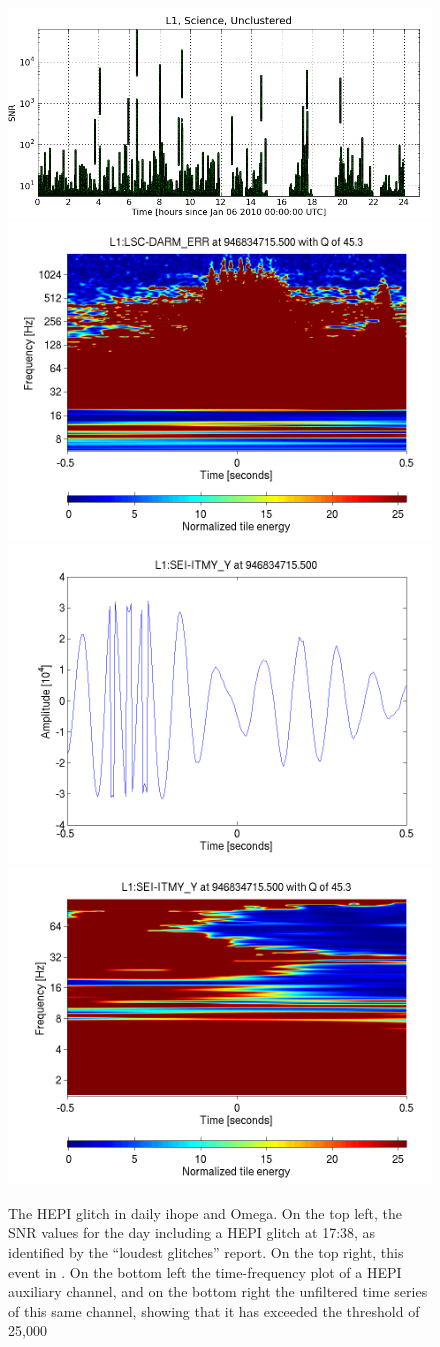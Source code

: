 \begin{figure}
  \includegraphics[width=0.5\linewidth]{figures/detchar/20100106_L1_0_UNCLUSTERED_snr_vs_time}
  \includegraphics[width=0.5\linewidth]{figures/detchar/946834715_499755859_L1_LSC-DARM_ERR_1_00_spectrogram_whitened} \\
  \includegraphics[width=0.5\linewidth]{figures/detchar/946834715_499755859_L1_SEI-ITMY_Y_1_00_timeseries_raw}
  \includegraphics[width=0.5\linewidth]{figures/detchar/946834715_499755859_L1_SEI-ITMY_Y_1_00_spectrogram_whitened}
  \caption[The HEPI glitch in daily ihope and Omega]{
  \label{f:daily_hepi}
The HEPI glitch in daily ihope and Omega.  On the top left, the SNR
values for the day including a HEPI glitch at 17:38, as identified by
the ``loudest glitches'' report.  On the top right, this event in
\darmerr.  On the bottom left the time-frequency plot of a HEPI
auxiliary channel, and on the bottom right the unfiltered time series
of this same channel, showing that it has exceeded the threshold of
25,000}
\end{figure}%

